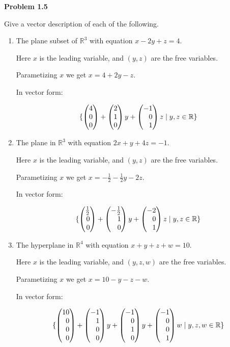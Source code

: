 \documentclass[12pt]{article}
\newenvironment{problem}[1][default]{
  \begin{framed}\begin{minipage}{0.97\textwidth}
  \setlength{\parskip}{4mm}
  {\bf Problem #1}
}{\end{minipage}\end{framed}}
\newenvironment{abc}{\begin{enumerate}[label={\bf(\alph*)}]}{\end{enumerate}}
\newcommand\m[2][]{
	\ifthenelse{\equal {#1} {}}
		{\begin{pmatrix*}[r]#2\end{pmatrix*}}
		{\left(\begin{array}{#1}#2\end{array}\right)}
}
\begin{document}
\begin{problem}[1.5]
	Give a vector description of each of the following.
\end{problem}

\begin{abc}
\item{
	The plane subset of $\mathbb{R}^3$ with equation $x - 2y + z = 4$.

	Here $x$ is the leading variable, and $(y, z)$ are the free variables.

	Parametizing $x$ we get $x = 4 + 2y - z$.

	In vector form:

	\begin{equation*}
		\{ \m{4 \\ 0 \\ 0} + \m{2 \\ 1 \\ 0} y + \m{-1 \\ 0 \\ 1} z \mid y, z \in \mathbb{R} \}
	\end{equation*}
}

\item{
	The plane in $\mathbb{R}^3$ with equation $2x + y + 4z = -1$.

	Here $x$ is the leading variable, and $(y, z)$ are the free variables.

	Parametizing $x$ we get $x = -\frac{1}{2} - \frac{1}{2}y - 2z$.

	In vector form:

	\begin{equation*}
		\{ \m{\frac{1}{2} \\ 0 \\ 0} + \m{-\frac{1}{2} \\ 1 \\ 0} y + \m{-2 \\ 0 \\ 1} z \mid y, z \in \mathbb{R} \}
	\end{equation*}
}

\item{
	The hyperplane in $\mathbb{R}^4$ with equation $x + y + z + w = 10$.

	Here $x$ is the leading variable, and $(y, z, w)$ are the free variables.

	Parametizing $x$ we get $x = 10 - y - z - w$.

	In vector form:

	\begin{equation*}
		\{ \m{10 \\ 0 \\ 0 \\ 0} + \m{-1 \\ 1 \\ 0 \\ 0} y + \m{-1 \\ 0 \\ 1 \\ 0} y + \m{-1 \\ 0 \\ 0 \\ 1} w \mid y, z, w \in \mathbb{R} \}
	\end{equation*}
}
\end{abc}
\end{document}
